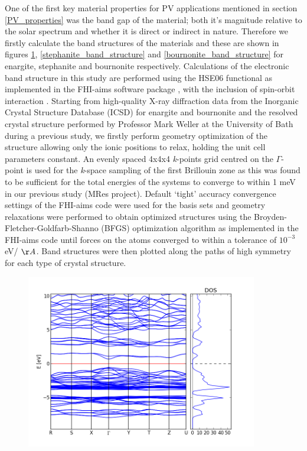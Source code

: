 One of the first key material properties for PV applications mentioned in section \ref{PV_properties} was the band gap of the material; both it's magnitude relative to the solar spectrum and whether it is direct or indirect in nature. Therefore we firstly calculate the band structures of the materials and these are shown in figures \ref{enargite_band_structure}, \ref{stephanite_band_structure} and \ref{bournonite_band_structure} for enargite, stephanite and bournonite respectively.
Calculations of the electronic band structure in this study are performed using the HSE06 functional \cite{HSE} as implemented in the FHI-aims software package \cite{aims, aims_hybrids, aims_parallel}, with the inclusion of spin-orbit interaction \cite{aims_SOC}.
Starting from high-quality X-ray diffraction data from the Inorganic Crystal Structure Database (ICSD)\cite{icsd} for enargite and bournonite and the resolved crystal structure performed by Professor Mark Weller at the University of Bath during a previous study, we firstly perform geometry optimization of the structure allowing only the ionic positions to relax, holding the unit cell parameters constant.
An evenly spaced 4x4x4 \textit{k}-points grid centred on the $\Gamma$-point is used for the \textit{k}-space sampling of the first Brillouin zone as this was found to be sufficient for the total energies of the systems to converge to within 1 meV in our previous study (MRes project).
Default `tight' accuracy convergence settings of the FHI-aims code were used for the basis sets and geometry relaxations were performed to obtain optimized structures using the Broyden-Fletcher-Goldfarb-Shanno (BFGS) optimization algorithm as implemented in the FHI-aims code \cite{aims} until forces on the atoms converged to within a tolerance of $10^{-3}$ eV/ $\AA$. Band structures were then plotted along the paths of high symmetry for each type of crystal structure.\\

\begin{figure}[h!]
  \centering
    \includegraphics[width=0.9\textwidth]{figures/enargite_band_structure.png}
    \caption{}
  \label{enargite_band_structure}
\end{figure}


